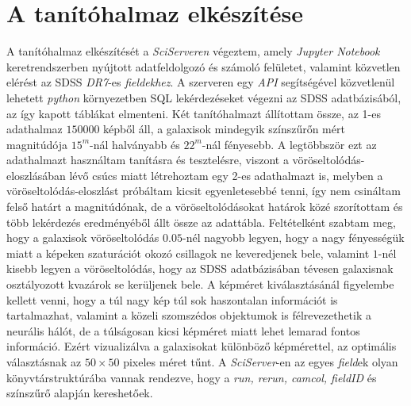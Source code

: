 \documentclass[12pt,letterpaper,twoside,openright]{book}
\begin{document}
 \section{A tanítóhalmaz elkészítése}
 A tanítóhalmaz elkészítését a \textit{SciServeren}\cite{sci} végeztem, amely \textit{Jupyter Notebook} keretrendszerben nyújtott adatfeldolgozó és számoló felületet, valamint közvetlen elérést az SDSS \textit{DR7}-es \textit{fieldekhez}. A szerveren egy \textit{API} segítségével közvetlenül lehetett \textit{python} környezetben SQL lekérdezéseket végezni az SDSS adatbázisából, az így kapott táblákat elmenteni. Két tanítóhalmazt állítottam össze, az 1-es adathalmaz $\num{150000}$ képből áll, a galaxisok mindegyik színszűrőn mért magnitúdója $15^m$-nál halványabb és $22^m$-nál fényesebb. A legtöbbször ezt az adathalmazt használtam tanításra és tesztelésre, viszont a vöröseltolódás-eloszlásában lévő csúcs miatt létrehoztam egy 2-es adathalmazt is, melyben a vöröseltolódás-eloszlást
 próbáltam kicsit egyenletesebbé tenni, így nem csináltam felső határt a magnitúdónak, de a vöröseltolódásokat határok közé szorítottam és több lekérdezés eredményéből állt össze az adattábla.
  \newline \indent
Feltételként szabtam meg, hogy a galaxisok vöröseltolódás $0.05$-nél nagyobb legyen, hogy a nagy fényességük miatt a képeken szaturációt okozó csillagok ne keveredjenek bele, valamint $1$-nél kisebb legyen a vöröseltolódás, hogy az SDSS adatbázisában tévesen galaxisnak osztályozott kvazárok se kerüljenek bele. A képméret kiválasztásánál figyelembe kellett venni, hogy a túl nagy kép túl sok haszontalan információt is tartalmazhat, valamint a közeli szomszédos objektumok is félrevezethetik a neurális hálót, de a túlságosan kicsi képméret miatt lehet lemarad fontos információ. Ezért vizualizálva a galaxisokat különböző képmérettel, az optimális választásnak az $50\times 50$ pixeles méret tűnt.
\newline\indent
 A \textit{SciServer}-en az egyes \textit{field}ek olyan könyvtárstruktúrába vannak rendezve, hogy a \textit{run, rerun, camcol, fieldID} és színszűrő alapján kereshetőek. 
\end{document}
